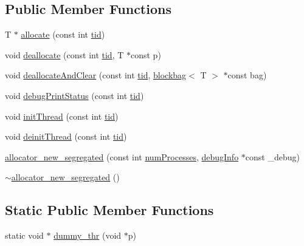 \subsection*{Public Member Functions}
\begin{DoxyCompactItemize}
\item 
T $\ast$ \hyperlink{classallocator__new__segregated_a5259d0e0d4777b6b4379a611bf6f90b1}{allocate} (const int \hyperlink{microbench_2main_8cpp_a9ca9869868fe7e7a38a921cc7de4103f}{tid})
\item 
void \hyperlink{classallocator__new__segregated_a99196d2db15094973ce77dee0c317ae5}{deallocate} (const int \hyperlink{microbench_2main_8cpp_a9ca9869868fe7e7a38a921cc7de4103f}{tid}, T $\ast$const p)
\item 
void \hyperlink{classallocator__new__segregated_a70d65a2e25c1abe13d2fb54e0dafc0c4}{deallocate\+And\+Clear} (const int \hyperlink{microbench_2main_8cpp_a9ca9869868fe7e7a38a921cc7de4103f}{tid}, \hyperlink{classblockbag}{blockbag}$<$ T $>$ $\ast$const bag)
\item 
void \hyperlink{classallocator__new__segregated_a659455bf01a11dbfd8a0762a4d4fdb40}{debug\+Print\+Status} (const int \hyperlink{microbench_2main_8cpp_a9ca9869868fe7e7a38a921cc7de4103f}{tid})
\item 
void \hyperlink{classallocator__new__segregated_a143dbe613cd2e5b903c2fefcc02238f2}{init\+Thread} (const int \hyperlink{microbench_2main_8cpp_a9ca9869868fe7e7a38a921cc7de4103f}{tid})
\item 
void \hyperlink{classallocator__new__segregated_ae56ef2f9fa45e5142cddbe862b342cc6}{deinit\+Thread} (const int \hyperlink{microbench_2main_8cpp_a9ca9869868fe7e7a38a921cc7de4103f}{tid})
\item 
\hyperlink{classallocator__new__segregated_ae05ebf7ffd3a4939e36d2a82f495a30c}{allocator\+\_\+new\+\_\+segregated} (const int \hyperlink{testing_8cpp_aa085812188e21ede75351d88b9b2c30d}{num\+Processes}, \hyperlink{classdebugInfo}{debug\+Info} $\ast$const \+\_\+debug)
\item 
\hyperlink{classallocator__new__segregated_aed2e73950c9ee0ef9d349c74fd30ecf8}{$\sim$allocator\+\_\+new\+\_\+segregated} ()
\end{DoxyCompactItemize}
\subsection*{Static Public Member Functions}
\begin{DoxyCompactItemize}
\item 
static void $\ast$ \hyperlink{classallocator__new__segregated_a6757b22908992b0149630326ce7f68ac}{dummy\+\_\+thr} (void $\ast$p)
\end{DoxyCompactItemize}
